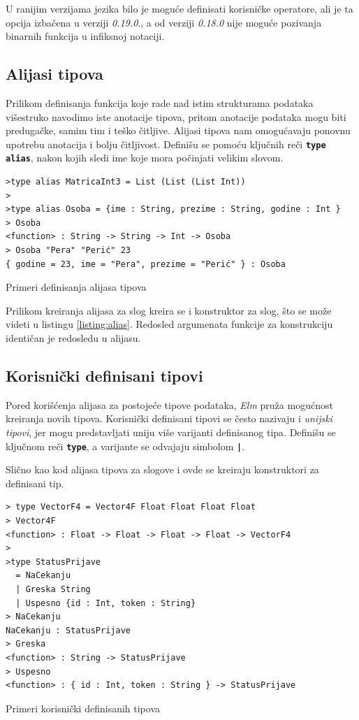 \documentclass[12pt,oneside]{memoir}
\begin{document}
U ranijim verzijama jezika bilo je moguće definisati korisničke operatore, ali je ta
opcija izbačena u verziji \emph{0.19.0}., a od verziji \emph{0.18.0} nije moguće pozivanja 
binarnih funkcija u infiksnoj notaciji.

\subsection{Alijasi tipova}
Prilikom definisanja funkcija koje rade nad istim strukturama podataka višestruko navodimo
iste anotacije tipova, pritom anotacije podataka mogu biti predugačke, samim tim i
teško čitljive. Alijasi tipova nam omogućavaju ponovnu upotrebu anotacija i bolju čitljivost.
Definišu se pomoću ključnih reči \texttt{\textbf{type alias}}, nakon kojih sledi ime koje
mora počinjati velikim slovom. 
\begin{listing}[h]
\begin{verbatim}
>type alias MatricaInt3 = List (List (List Int))
>
>type alias Osoba = {ime : String, prezime : String, godine : Int }
> Osoba
<function> : String -> String -> Int -> Osoba
> Osoba "Pera" "Perić" 23
{ godine = 23, ime = "Pera", prezime = "Perić" } : Osoba
\end{verbatim}
\caption{Primeri definisanja alijasa tipova}
\label{listing:alias}
\end{listing}

Prilikom kreiranja alijasa za slog kreira se i konstruktor za slog, što se može videti
u listingu \ref{listing:alias}. Redosled argumenata funkcije za konstrukciju identičan je
redosledu u alijasu.
\subsection{Korisnički definisani tipovi}
Pored korišćenja alijasa za postojeće tipove podataka, \emph{Elm} pruža mogućnost kreiranja novih 
tipova. Korisnički definisani tipovi se često nazivaju i \emph{unijski tipovi}, jer mogu  
predstavljati uniju više varijanti definisanog tipa. Definišu se ključnom reči 
\textbf{\texttt{type}}, a varijante se odvajaju simbolom \texttt{\textbf{|}}.

Slično kao kod alijasa tipova za slogove i ovde se kreiraju konstruktori za definisani tip. 
\begin{listing}[h]
\begin{verbatim}
> type VectorF4 = Vector4F Float Float Float Float
> Vector4F
<function> : Float -> Float -> Float -> Float -> VectorF4
>
>type StatusPrijave 
  = NaCekanju 
  | Greska String 
  | Uspesno {id : Int, token : String}
> NaCekanju
NaCekanju : StatusPrijave
> Greska
<function> : String -> StatusPrijave
> Uspesno
<function> : { id : Int, token : String } -> StatusPrijave
\end{verbatim}
\caption{ Primeri korisnički definisanih tipova}
\end{listing}
\end{document}
